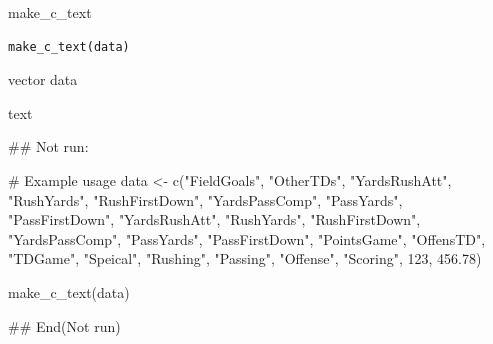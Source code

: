 \documentclass[a4paper]{book}
\begin{document}
%
\begin{Description}
make\_c\_text
\end{Description}
%
\begin{Usage}
\begin{verbatim}
make_c_text(data)
\end{verbatim}
\end{Usage}
%
\begin{Arguments}
\begin{ldescription}
\item[\code{data}] vector data
\end{ldescription}
\end{Arguments}
%
\begin{Value}
text
\end{Value}
%
\begin{Examples}
\begin{ExampleCode}


\#\# Not run: 

# Example usage
data <- c("FieldGoals", "OtherTDs", "YardsRushAtt", "RushYards",
          "RushFirstDown", "YardsPassComp", "PassYards", "PassFirstDown",
          "YardsRushAtt", "RushYards", "RushFirstDown", "YardsPassComp",
          "PassYards", "PassFirstDown", "PointsGame", "OffensTD",
          "TDGame", "Speical", "Rushing", "Passing",
          "Offense", "Scoring", 123, 456.78)

make_c_text(data)


## End(Not run)
\end{ExampleCode}
\end{Examples}
\end{document}
